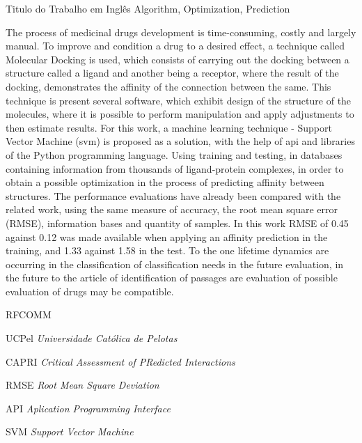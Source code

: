\documentclass[tcc, capa]{texucpel}
\begin{document}
\begin{englishabstract}
  {Titulo do Trabalho em Inglês}
  {Algorithm, Optimization, Prediction}  
  
The process of  medicinal drugs development is time-consuming, costly and largely manual.
To improve and condition a drug to a desired effect, a technique called Molecular Docking  is used, which consists of carrying out the docking between a structure called a ligand and another being a receptor, where the result of the docking, demonstrates the affinity of the connection between the same.
This technique is present several software, which exhibit design of the structure of the molecules, where it is possible to perform manipulation and apply adjustments to then estimate results.
For this work, a machine learning technique - Support Vector Machine (svm) is proposed as a solution, with the help of api and libraries of the Python programming language. Using training and testing, in databases containing information from thousands of ligand-protein complexes, in order to obtain a possible optimization in the process of predicting affinity between structures.
The performance evaluations have already been compared with the related work, using the same measure of accuracy, the root mean square error (RMSE), information bases and quantity of samples.
In this work RMSE of 0.45 against 0.12 was made available when applying an affinity prediction in the training, and 1.33 against 1.58 in the test.
To the one lifetime dynamics are occurring in the classification of classification needs in the future evaluation, in the future to the article of identification of passages are evaluation of possible evaluation of drugs may be compatible.

\end{englishabstract}

\listoffigures

\listoftables

\begin{listofabbrv}{RFCOMM}
		\item[UCPel] \textit{Universidade Cat\'olica de Pelotas}
        \item[CAPRI] \textit{Critical Assessment of PRedicted Interactions}
        \item[RMSE] \textit{Root Mean Square Deviation}
        \item[API] \textit{Aplication Programming Interface}
        \item[SVM] \textit{Support Vector Machine}            
\end{listofabbrv}
\end{document}
